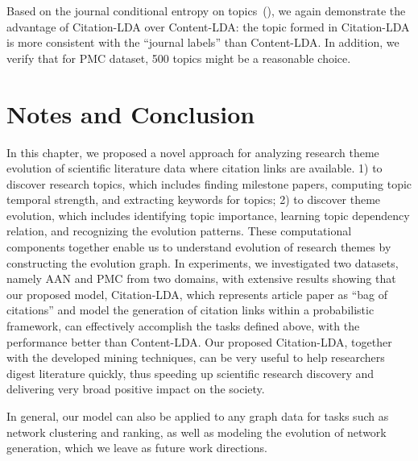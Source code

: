 Based on the journal conditional entropy on
topics~(), we again demonstrate the advantage of
Citation-LDA over Content-LDA: the topic formed in Citation-LDA is more
consistent with the ``journal labels'' than Content-LDA. In addition, we verify
that for PMC dataset, 500 topics might be a reasonable choice.


\section{Notes and Conclusion}\label{sec::citation-conclusion}

In this chapter, we proposed a novel approach for analyzing research theme
evolution of scientific literature data where citation links are available.  1)
to discover research topics, which includes finding milestone papers, computing
topic temporal strength, and extracting keywords for topics; 2) to discover
theme evolution, which includes identifying topic importance, learning topic
dependency relation, and recognizing the evolution patterns.  These
computational components together enable us to understand evolution of research
themes by constructing the evolution graph.  In experiments, we investigated two
datasets, namely AAN and PMC from two domains, with extensive results showing
that our proposed model, Citation-LDA, which represents article paper as ``bag
of citations'' and model the generation of citation links within a probabilistic
framework, can effectively accomplish the tasks defined above, with the
performance better than Content-LDA.  Our proposed Citation-LDA, together with
the developed mining techniques, can be very useful to help researchers digest
literature quickly, thus speeding up scientific research discovery and
delivering very broad positive impact on the society.

In general, our model can also be applied to any graph data for tasks such as
network clustering and ranking, as well as modeling the evolution of network
generation, which we leave as future work directions.

